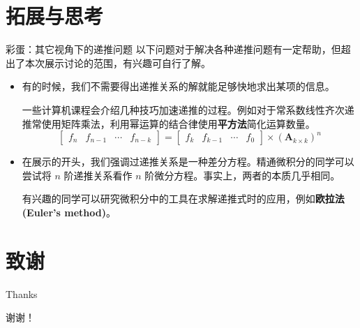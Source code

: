 \documentclass{beamer}
\begin{document}
\section{拓展与思考}

\begin{frame}{彩蛋：其它视角下的递推问题}
    以下问题对于解决各种递推问题有一定帮助，但超出了本次展示讨论的范围，有兴趣可自行了解。
    \pause
    \begin{itemize}
        \item 有的时候，我们不需要得出递推关系的解就能足够快地求出某项的信息。
        
                一些计算机课程会介绍几种技巧加速递推的过程。例如对于常系数线性齐次递推常使用矩阵乘法，利用幂运算的结合律使用\textbf{平方法}简化运算数量。
        \begin{displaymath}
            \begin{bmatrix}
                f_n & f_{n-1} & \cdots & f_{n-k}
               \end{bmatrix} = \begin{bmatrix}
                f_k & f_{k-1} & \cdots & f_{0}
               \end{bmatrix} \times (\boldsymbol{A}_{k\times k})^n
        \end{displaymath}
        \pause
        \item 在展示的开头，我们强调过递推关系是一种差分方程。精通微积分的同学可以尝试将 $n$ 阶递推关系看作 $n$ 阶微分方程。事实上，两者的本质几乎相同。
        
            有兴趣的同学可以研究微积分中的工具在求解递推式时的应用，例如\textbf{欧拉法 (Euler's method)}。
    \end{itemize}
\end{frame}

\section{致谢}

\begin{frame}{Thanks}
    \begin{center}
        \Huge{谢谢！}
    \end{center}
\end{frame}
\end{document}
